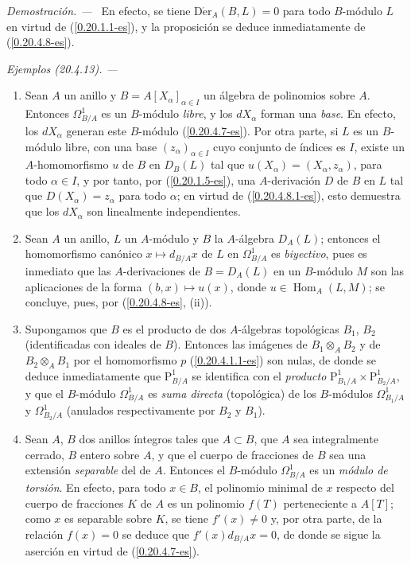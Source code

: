 \documentclass[10pt,oneside]{book}
\makeatletter
\newcommand{\sref}[1]{\textup{(\ref{#1})}}
\newcommand{\setmanualcurrentlabel}[1]{\def\@currentlabel{#1}}
\newenvironment{examples}[1][]{%
  \setmanualcurrentlabel{#1}\par\medskip\noindent\textit{Ejemplos (#1). ---}\ }{\par}
\newenvironment{proof}{%
  \par\medskip\noindent\textit{Demostración. ---\ }}{\par}
\makeatother
\begin{document}
\begin{proof}
En efecto, se tiene $\operatorname{D\acute{e}r}_A(B,L)=0$ para todo $B$-módulo
$L$ en virtud de \sref{0.20.1.1-es}, y la proposición se deduce inmediatamente
de \sref{0.20.4.8-es}.
\end{proof}

\begin{examples}[20.4.13]
\label{0.20.4.13-es}
\begin{enumerate}
  \item[\rm(i)] Sean $A$ un anillo y
  $B=A[X_\alpha]_{\alpha\in I}$ un álgebra de polinomios sobre $A$. Entonces
  $\Omega^1_{B/A}$ es un $B$-módulo \emph{libre}, y los $dX_\alpha$ forman una
  \emph{base}. En efecto, los $dX_\alpha$ generan este $B$-módulo
  \sref{0.20.4.7-es}. Por otra parte, si $L$ es un $B$-módulo libre, con
  una base $(z_\alpha)_{\alpha\in I}$ cuyo conjunto de índices es $I$, existe
  un $A$-homomorfismo $u$ de $B$ en $D_B(L)$ tal que
  $u(X_\alpha)=(X_\alpha,z_\alpha)$, para todo $\alpha\in I$, y por tanto, por
  \sref{0.20.1.5-es}, una $A$-derivación $D$ de $B$ en $L$ tal que
  $D(X_\alpha)=z_\alpha$ para todo $\alpha$; en virtud de
  \sref{0.20.4.8.1-es}, esto demuestra que los $dX_\alpha$ son linealmente
  independientes.
  \item[\rm(ii)] Sean $A$ un anillo, $L$ un $A$-módulo y $B$ la
  $A$-álgebra $D_A(L)$; entonces el homomorfismo canónico
  $x\mapsto d_{B/A}x$ de $L$ en $\Omega^1_{B/A}$ es \emph{biyectivo}, pues
  es inmediato que las $A$-derivaciones de $B=D_A(L)$ en un $B$-módulo
  $M$ son las aplicaciones de la forma $(b,x)\mapsto u(x)$, donde
  $u\in\operatorname{Hom}_A(L,M)$; se concluye, pues, por
  (\ref{0.20.4.8-es}, (ii)).
  \item[\rm(iii)] Supongamos que $B$ es el producto de dos $A$-álgebras
  topológicas $B_1$, $B_2$ (identificadas con ideales de $B$). Entonces las
  imágenes de $B_1\otimes_A B_2$ y de $B_2\otimes_A B_1$ por el homomorfismo
  $p$ \sref{0.20.4.1.1-es} son nulas, de donde se deduce inmediatamente que
  $\mathrm{P}^1_{B/A}$ se identifica con el \emph{producto}
  $\mathrm{P}^1_{B_1/A}\times\mathrm{P}^1_{B_2/A}$, y que el $B$-módulo
  $\Omega^1_{B/A}$ es \emph{suma directa} (topológica) de los $B$-módulos
  $\Omega^1_{B_1/A}$ y $\Omega^1_{B_2/A}$ (anulados respectivamente por
  $B_2$ y $B_1$).
  \item[\rm(iv)] Sean $A$, $B$ dos anillos íntegros tales que $A\subset
  B$, que $A$ sea integralmente cerrado, $B$ entero sobre $A$, y que el cuerpo
  de fracciones de $B$ sea una extensión \emph{separable} del de $A$. Entonces
  el $B$-módulo $\Omega^1_{B/A}$ es un \emph{módulo de torsión}. En efecto,
  para todo $x\in B$, el polinomio minimal de $x$ respecto del cuerpo de
  fracciones $K$ de $A$ es un polinomio $f(T)$ perteneciente a $A[T]$; como
  $x$ es separable sobre $K$, se tiene $f'(x)\neq0$ y, por otra parte, de
  la relación $f(x)=0$ se deduce que $f'(x)d_{B/A}x=0$, de donde se sigue
  la aserción en virtud de \sref{0.20.4.7-es}.
\end{enumerate}
\end{examples}
\end{document}

